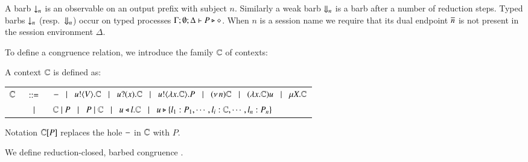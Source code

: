 
\noi A barb $\downarrow_{n}$ is an observable on an output prefix with subject $n$.
Similarly a weak barb $\Downarrow_{n}$ is a barb after a number of reduction steps.
Typed barbs $\downarrow_{n}$ (resp.\ $\Downarrow_{n}$)
occur on typed processes $\Gamma; \emptyset; \Delta \vdash P \triangleright \diamond$.
When $n$ is a session name we require that its dual endpoint $\overline{n}$ is not present
in the session environment $\Delta$.

To define a congruence relation, we introduce the family ${\Bbb C}$ of contexts:

\begin{definition}[Context]
	A context ${\Bbb C}$ is defined as:

	\begin{tabular}{rcl}
		${\Bbb C}$ & $\;\;::=\;\;$ & $- \;\;\;|\;\;\; u ! \langle V \rangle . {\Bbb C} \;\;\;|\;\;\; u ? (x) . {\Bbb C} \;\;\;|\;\;\; u ! \langle \lambda x.{\Bbb C} \rangle . P \;\;\;|\;\;\; (\nu\, n) {\Bbb C}
		\;\;\;|\;\;\; (\lambda x.{\Bbb C})u \;\;\;|\;\;\; \mu X. {\Bbb C}$ 
		\\
		&$\;\;\;|\;\;\;$& ${\Bbb C} \;|\; P \;\;\;|\;\;\; P \;|\; {\Bbb C}
		\;\;\;|\;\;\; u \triangleleft l . {\Bbb C} \;\;\;|\;\;\; u \triangleright \{l_1:P_1,\cdots,l_i:{\Bbb C},\cdots,l_n:P_n\}$
	\end{tabular}

\noi 
Notation ${\Bbb C}[P]$ replaces 
the hole $-$ in ${\Bbb C}$ with $P$.
\end{definition}


\noi We define reduction-closed, barbed congruence \cite{HondaKYoshida95}. 


